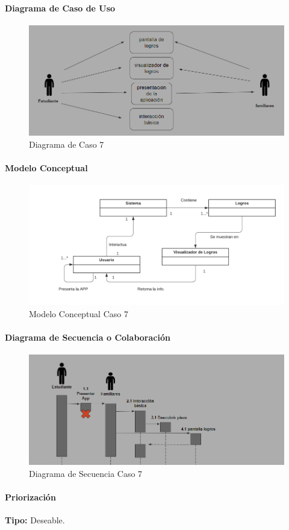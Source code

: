 \paragraph{Diagrama de Caso de Uso}

\begin{figure}[H]
\centerline{\includegraphics[width=15cm]{imgs/CasoUso_7.PNG}}
\caption{Diagrama de Caso 7}
\label{fig_7_1}
\end{figure}

\paragraph{Modelo Conceptual}

\begin{figure}[H]
\centerline{\includegraphics[width=15cm]{imgs/ModeloConceptualCaso_7_3.png}}
\caption{Modelo Conceptual Caso 7}
\label{fig_7_2}
\end{figure}

\paragraph{Diagrama de Secuencia o Colaboración}

\begin{figure}[H]
\centerline{\includegraphics[width=15cm]{imgs/CasoUso_7_2.PNG}}
\caption{Diagrama de Secuencia Caso 7}
\label{fig_7_3}
\end{figure}

\paragraph{Priorización}
{\textbf {Tipo:}}
Deseable.